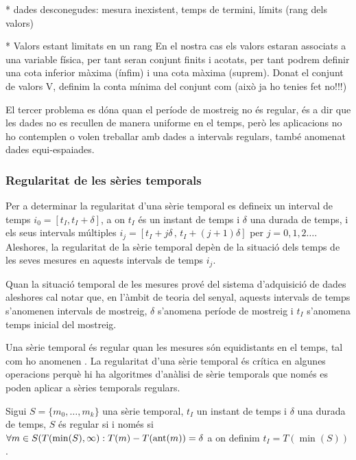 * dades desconegudes: mesura inexistent, temps de termini, límits (rang dels valors)

* Valors estant limitats en un rang
En el nostra cas els valors estaran associats a una variable física, per tant seran conjunt finits i acotats, per tant podrem definir una cota inferior màxima (ínfim) i una cota màxima (suprem). Donat el conjunt de valors V, definim la conta mínima del conjunt com     (això ja ho tenies fet no!!!)


El tercer problema es dóna quan el període de mostreig no  és regular,  és a dir que les dades no es recullen de manera uniforme en el temps, però les aplicacions no ho contemplen o volen treballar amb dades a intervals regulars, també anomenat dades equi-espaiades.




\subsubsection{Regularitat de les sèries temporals} 

Per a determinar la regularitat d'una sèrie temporal es defineix un
interval de temps $i_0=[t_I,t_I+\delta]$, a on $t_I$ és un instant de
temps i $\delta$ una durada de temps, i els seus intervals múltiples
$i_j=[t_I+j\delta\, ,\, t_I+(j+1)\delta]$ per
$j=0,1,2\ldots$. Aleshores, la regularitat de la sèrie temporal depèn
de la situació dels temps de les seves mesures en aquests intervals de
temps $i_j$.
 
Quan la situació temporal de les mesures prové del sistema
d'adquisició de dades aleshores cal notar que, en l'àmbit de
teoria del senyal, aquests intervals de temps s'anomenen intervals de
mostreig, $\delta$ s'anomena període de mostreig i $t_I$ s'anomena
temps inicial del mostreig.


Una sèrie temporal és regular quan les mesures són equidistants en el
temps, tal com ho anomenen \textcite{last:hetland}.  La regularitat
d'una sèrie temporal és crítica en algunes operacions perquè hi ha
algoritmes d'anàlisi de sèrie temporals que només es poden aplicar a
sèries temporals regulars.
\begin{definition}
  \label{def:st:regular}
  Sigui $S=\{m_0,\ldots,m_k\}$ una sèrie temporal, $t_I$ un instant de
  temps i $\delta$ una durada de temps, $S$ és regular si i
  només si $\forall m \in S(T(\min(S),\infty):T(m) - T(\operatorname*{ant}(m)) =
  \delta$ a on definim $t_I=T(\min(S))$.
\end{definition}

